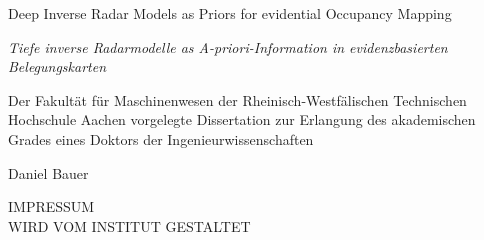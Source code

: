 
\begin{titlepage}
  \centering
  \begin{minipage}[t]{9.8cm}
      \begin{center}
          {\large Deep Inverse Radar Models as Priors for evidential Occupancy Mapping}
          \bigskip
      \end{center}
  \end{minipage}
  \begin{minipage}[t]{9.8cm}
      \begin{center}
          {\large \textcolor{ikagrey}{\textit{Tiefe inverse Radarmodelle as A-priori-Information in evidenzbasierten Belegungskarten}}}
          \bigskip
      \end{center}
  \end{minipage}
  \vfill
  \begin{minipage}[t]{16.5cm}
      \begin{center}
          Der Fakultät für Maschinenwesen der Rheinisch-Westfälischen Technischen Hochschule Aachen vorgelegte Dissertation zur Erlangung des akademischen Grades eines Doktors der Ingenieurwissenschaften
      \end{center}
  \end{minipage}
  \vfill
  \begin{minipage}[t]{9.8cm}
      \begin{center}
          Daniel Bauer
      \end{center}
  \end{minipage}
  \vfill
\end{titlepage}
\newpage
\pagestyle{empty}
\vspace{10cm}
\begin{center}
  IMPRESSUM\\
  \bigskip
  WIRD VOM INSTITUT GESTALTET
\end{center}
\vfill
\restoregeometry
